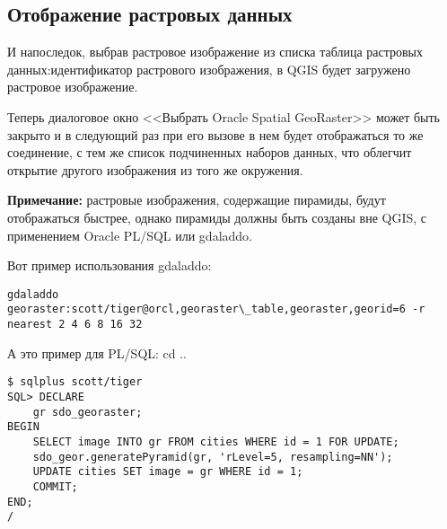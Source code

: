 \subsection{Отображение растровых данных}

И напоследок, выбрав растровое изображение из списка таблица растровых
данных:идентификатор растрового изображения, в QGIS будет загружено
растровое изображение.

Теперь диалоговое окно <<Выбрать Oracle Spatial GeoRaster>> может быть
закрыто и в следующий раз при его вызове в нем будет отображаться то же
соединение, с тем же список подчиненных наборов данных, что облегчит
открытие другого изображения из того же окружения.

\textbf{Примечание:} растровые изображения, содержащие пирамиды, будут
отображаться быстрее, однако пирамиды должны быть созданы вне QGIS, с
применением Oracle PL/SQL или gdaladdo.

Вот пример использования gdaladdo:

\begin{verbatim}
gdaladdo georaster:scott/tiger@orcl,georaster\_table,georaster,georid=6 -r
nearest 2 4 6 8 16 32
\end{verbatim}

А это пример для PL/SQL:
cd ..
\begin{verbatim}
$ sqlplus scott/tiger
SQL> DECLARE
    gr sdo_georaster;
BEGIN
    SELECT image INTO gr FROM cities WHERE id = 1 FOR UPDATE;
    sdo_geor.generatePyramid(gr, 'rLevel=5, resampling=NN');
    UPDATE cities SET image = gr WHERE id = 1;
    COMMIT;
END;
/
\end{verbatim}

\FloatBarrier
